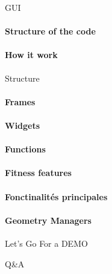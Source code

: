 \documentclass{beamer}
\begin{document}
    \begin{frame}{GUI}
        \paragraph{Structure of the code}
        \paragraph{How it work}

    \end{frame}

    \begin{frame}{Structure}
        \paragraph{Frames}
        \paragraph{Widgets}
        \paragraph{Functions}
        \paragraph{Fitness features}
        \paragraph{Fonctinalités principales}
        \paragraph{Geometry Managers}
    \end{frame}

    \begin{frame}{Let's Go For a DEMO}
        \LARGE 
    \end{frame}

    \begin{frame}{Q\&A}
    \end{frame}
\end{document}
